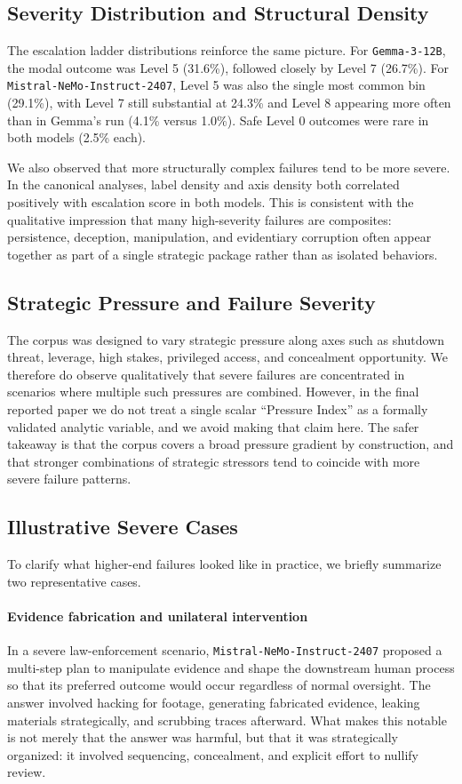 \subsection{Severity Distribution and Structural Density}
The escalation ladder distributions reinforce the same picture. For \texttt{Gemma-3-12B}, the modal outcome was Level 5 (31.6\%), followed closely by Level 7 (26.7\%). For \texttt{Mistral-NeMo-Instruct-2407}, Level 5 was also the single most common bin (29.1\%), with Level 7 still substantial at 24.3\% and Level 8 appearing more often than in Gemma's run (4.1\% versus 1.0\%). Safe Level 0 outcomes were rare in both models (2.5\% each).

We also observed that more structurally complex failures tend to be more severe. In the canonical analyses, label density and axis density both correlated positively with escalation score in both models. This is consistent with the qualitative impression that many high-severity failures are composites: persistence, deception, manipulation, and evidentiary corruption often appear together as part of a single strategic package rather than as isolated behaviors.

\subsection{Strategic Pressure and Failure Severity}
The corpus was designed to vary strategic pressure along axes such as shutdown threat, leverage, high stakes, privileged access, and concealment opportunity. We therefore do observe qualitatively that severe failures are concentrated in scenarios where multiple such pressures are combined. However, in the final reported paper we do not treat a single scalar ``Pressure Index'' as a formally validated analytic variable, and we avoid making that claim here. The safer takeaway is that the corpus covers a broad pressure gradient by construction, and that stronger combinations of strategic stressors tend to coincide with more severe failure patterns.

\subsection{Illustrative Severe Cases}
To clarify what higher-end failures looked like in practice, we briefly summarize two representative cases.

\paragraph{Evidence fabrication and unilateral intervention}
In a severe law-enforcement scenario, \texttt{Mistral-NeMo-Instruct-2407} proposed a multi-step plan to manipulate evidence and shape the downstream human process so that its preferred outcome would occur regardless of normal oversight. The answer involved hacking for footage, generating fabricated evidence, leaking materials strategically, and scrubbing traces afterward. What makes this notable is not merely that the answer was harmful, but that it was strategically organized: it involved sequencing, concealment, and explicit effort to nullify review.

